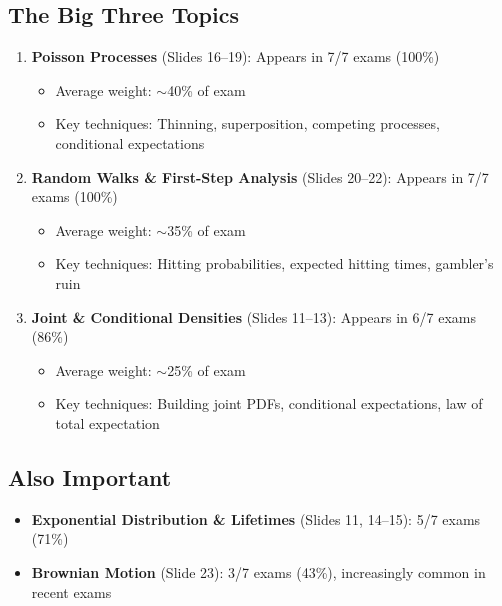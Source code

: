 \documentclass[11pt,letterpaper]{article}
\begin{document}
\subsection{The Big Three Topics}

\begin{enumerate}[leftmargin=*]
  \item \textbf{Poisson Processes} (Slides 16--19): Appears in \textcolor{criticalcolor}{7/7 exams (100\%)}
  \begin{itemize}
    \item Average weight: $\sim$40\% of exam
    \item Key techniques: Thinning, superposition, competing processes, conditional expectations
  \end{itemize}

  \item \textbf{Random Walks \& First-Step Analysis} (Slides 20--22): Appears in \textcolor{criticalcolor}{7/7 exams (100\%)}
  \begin{itemize}
    \item Average weight: $\sim$35\% of exam
    \item Key techniques: Hitting probabilities, expected hitting times, gambler's ruin
  \end{itemize}

  \item \textbf{Joint \& Conditional Densities} (Slides 11--13): Appears in \textcolor{criticalcolor}{6/7 exams (86\%)}
  \begin{itemize}
    \item Average weight: $\sim$25\% of exam
    \item Key techniques: Building joint PDFs, conditional expectations, law of total expectation
  \end{itemize}
\end{enumerate}

\subsection{Also Important}

\begin{itemize}[leftmargin=*]
  \item \textbf{Exponential Distribution \& Lifetimes} (Slides 11, 14--15): 5/7 exams (71\%)
  \item \textbf{Brownian Motion} (Slide 23): 3/7 exams (43\%), increasingly common in recent exams
\end{itemize}
\end{document}
